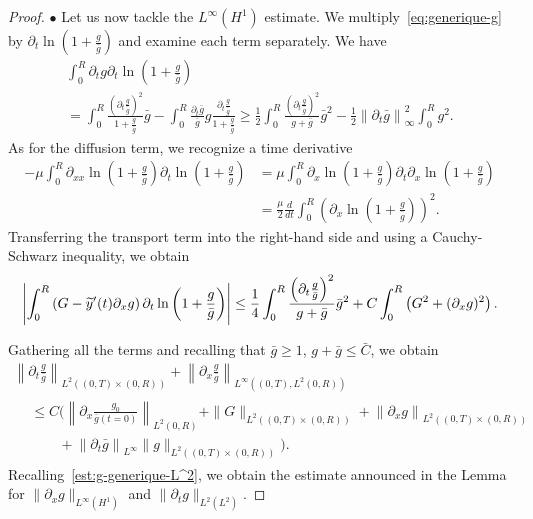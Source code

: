 \documentclass[10pt]{amsart}
\theoremstyle{definition}\newtheorem{defi}[theo]{Definition}\newtheorem{rema}[theo]{Remark}\newtheorem{exam}[theo]{Example}\newtheorem{exem}[theo]{Example}\newtheorem{nota}[theo]{Notation}
\newcommand{\p}{\partial}
\let\oldtilde\tilde
\renewcommand*{\tilde}[1]{\mathchoice{\widetilde{#1}}{\widetilde{#1}}{\oldtilde{#1}}{\oldtilde{#1}}}
\begin{document}
\begin{proof}
$\bullet$ Let us now tackle the $L^\infty(H^1)$ estimate. We multiply~\eqref{eq:generique-g} by $\p_t \ln (1+\frac{g}{\bar g})$ and examine each term separately. We have
\begin{multline*}
\int_0^R \p_t g \p_t \ln \left(1 + \frac{g}{\bar g}\right) \\
= \int_0^R \frac{\left(\p_t \frac{g}{\bar g}\right)^2 }{1 + \frac{g}{\bar g}}\bar g - \int_0^R \frac{\p_t \bar g}{\bar g} g \frac{\p_t \frac{g}{\bar g}}{1 + \frac{g}{\bar g}}\geq \frac{1}{2} \int_0^R\frac{\left(\p_t \frac{g}{\bar g}\right)^2 }{g+ \bar g}\bar g^2 -\frac{1}{2}\left\|\p_t \bar g\right\|_\infty^2 \int_0^R g^2.
\end{multline*}
As for the diffusion term, we recognize a time derivative
\begin{align*}
-\mu\int_0^R \p_{xx}\ln\left(1 + \frac{g}{\bar g}\right)\p_t \ln \left(1 + \frac{g}{\bar g}\right)
&=\mu \int_0^R \p_x\ln\left(1 + \frac{g}{\bar g}\right) \p_t\p_x \ln\left(1 + \frac{g}{\bar g}\right)\\
&=\frac{\mu}{2}\frac{d}{dt}\int_0^R \left(\p_x \ln\left(1 + \frac{g}{\bar g}\right)\right)^2.
\end{align*}
Transferring the transport term into the right-hand side and using a Cauchy-Schwarz inequality, we obtain
\begin{align*}
\left| \int_0^R \left(G-\tilde y'(t)\p_x g\right) \p_t \ln \left(1 + \frac{g}{\bar g}\right) \right|
\leq \frac{1}{4}\int_0^R\frac{\left(\p_t \frac{g}{\bar g}\right)^2 }{g+ \bar g}\bar g^2 + C \int_0^R \left(G^2 + (\p_x g)^2\right).
\end{align*}

Gathering all the terms and recalling that $\bar g \geq 1$, $g+\bar g \leq \bar C$, we obtain
\begin{multline*}
\left\| \p_t \frac{g}{\bar g}\right\|_{L^2((0,T)\times (0,R))} + \left\| \p_x \frac{g}{\bar g}\right\|_{L^\infty\left((0,T), L^2 (0,R)\right)}\\
\begin{aligned}
&\leq C \Big(\left\| \p_x \frac{g_0}{\bar g(t=0)}\right\|_{L^2 (0,R)} + \| G\|_{L^2\left((0,T)\times (0,R)\right)} + \left\| \p_x g\right\|_{L^2\left((0,T)\times (0,R)\right)} \\
&\qquad+ \left\|\p_t \bar g\right\|_{L^\infty} \|g\|_{L^2\left((0,T)\times (0,R)\right)}\Big).
\end{aligned}
\end{multline*}
Recalling~\eqref{est:g-generique-L^2}, we obtain the estimate announced in the Lemma for $\|\p_x g\|_{L^\infty(H^1)}$ and $\|\p_t g\|_{L^2(L^2)}$.


\end{proof}
\end{document}
